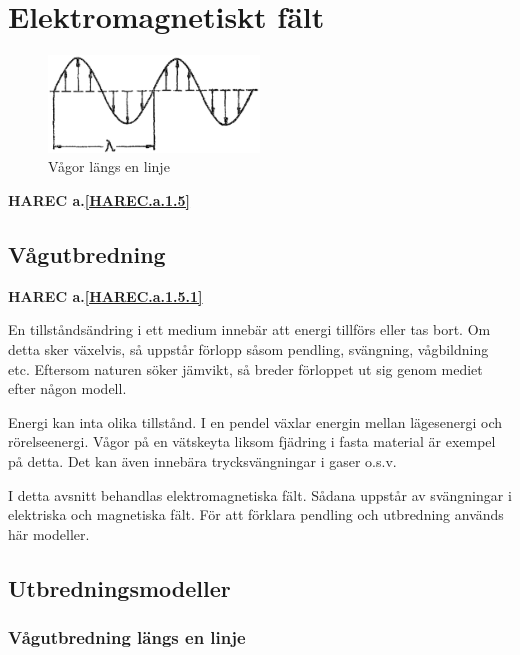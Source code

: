 \section{Elektromagnetiskt fält}

\begin{figure}
  \includegraphics[width=0.5\textwidth]{images/cropped_pdfs/bild_2_1-10.pdf}
  \caption{Vågor längs en linje}
  \label{fig:BildII1-10}
\end{figure}

\textbf{HAREC a.\ref{HAREC.a.1.5}\label{myHAREC.a.1.5}}

\subsection{Vågutbredning}
\textbf{HAREC a.\ref{HAREC.a.1.5.1}\label{myHAREC.a.1.5.1}}

En tillståndsändring i ett medium innebär att energi tillförs eller tas bort.
Om detta sker växelvis, så uppstår förlopp såsom pendling, svängning,
vågbildning etc.
Eftersom naturen söker jämvikt, så breder förloppet ut sig genom mediet efter
någon modell.

Energi kan inta olika tillstånd. I en pendel växlar energin mellan lägesenergi
och rörelseenergi. Vågor på en vätskeyta liksom fjädring i fasta material är
exempel på detta. Det kan även innebära trycksvängningar i gaser o.s.v.

I detta avsnitt behandlas elektromagnetiska fält. Sådana uppstår av svängningar
i elektriska och magnetiska fält. För att förklara pendling och utbredning
används här modeller.

\subsection{Utbredningsmodeller}

\subsubsection{Vågutbredning längs en linje}

